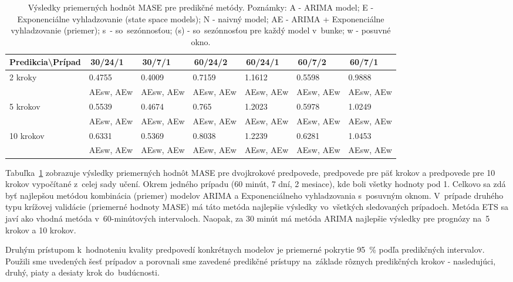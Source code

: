 \documentclass[thesismargins, thesislinespacing, openright, upjsfrontpage]{rnthesis}
\begin{document}
\begin{table}[h]
    \centering
    \footnotesize 
    \begin{tabular}{|p{3cm}|p{1.5cm}|p{1.5cm}|p{1.5cm}|p{1.5cm}|p{1.5cm}|p{1.5cm}|} \hline
        Predikcia\textbackslash Prípad & \,30/24/1\, & \,30/7/1\, & \,60/24/2\, & \,60/24/1\, & \,60/7/2\, & \,60/7/1\, \\    
        \hline\hline
       \multirow{2}{*}{2 kroky} & 0.4755 & 0.4009 & 0.7159 & 1.1612 & 0.5598 & 0.9888 \\
       & AEsw, AEw & AEsw, AEw & AEsw, AEw & AEsw, AEw & AEsw, AEw & AEsw, AEw  \\
        \hline
        \multirow{2}{*}{5 krokov} & 0.5539 & 0.4674 & 0.765 & 1.2023 & 0.5978 & 1.0249 \\
        & AEsw, AEw & AEsw, AEw & AEsw, AEw & AEsw, AEw & AEsw, AEw & AEsw, AEw  \\
        \hline
        \multirow{2}{*}{10 krokov} & 0.6331 & 0.5369 & 0.8038 & 1.2239 & 0.6281 & 1.0453 \\
        & AEsw, AEw & AEsw, AEw & AEsw, AEw & AEsw, AEw & AEsw, AEw & AEsw, AEw  \\
        \hline     
    \end{tabular}
    \caption{Výsledky priemerných hodnôt MASE pre predikčné metódy. Poznámky: A - ARIMA model; E - Exponenciálne vyhladzovanie (state space models); N - naivný model; AE - ARIMA + Exponenciálne vyhladzovanie (priemer); s~- so~sezónnosťou; (s) - so~sezónnosťou pre každý model v~bunke; w - posuvné okno.}
    \label{tab:mase}
\end{table}

Tabuľka~\ref{tab:mase} zobrazuje výsledky priemerných hodnôt MASE pre dvojkrokové predpovede, predpovede pre päť krokov a predpovede pre 10 krokov vypočítané z~celej sady učení. Okrem jedného prípadu (60 minút, 7 dní, 2 mesiace), kde boli všetky hodnoty pod 1. Celkovo sa zdá byť najlepšou metódou kombinácia (priemer) modelov ARIMA a Exponenciálneho vyhladzovania s~posuvným oknom. V~prípade druhého typu krížovej validácie (priemerné hodnoty MASE) má táto metóda najlepšie výsledky vo~všetkých sledovaných prípadoch. Metóda ETS sa javí ako vhodná metóda v~60-minútových intervaloch. Naopak, za 30 minút má metóda ARIMA najlepšie výsledky pre prognózy na~5 krokov a 10 krokov.


Druhým prístupom k~hodnoteniu kvality predpovedí konkrétnych modelov je priemerné pokrytie 95~\% podľa predikčných intervalov. Použili sme uvedených šesť prípadov a porovnali sme zavedené predikčné prístupy na~základe rôznych predikčných krokov - nasledujúci, druhý, piaty a desiaty krok do~budúcnosti.
\end{document}
